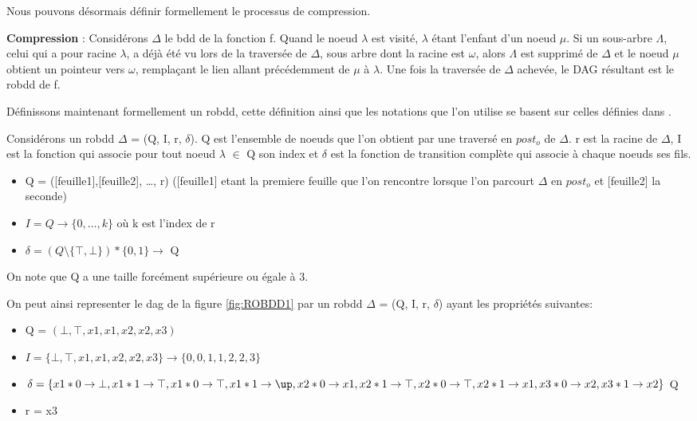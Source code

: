 \documentclass[french]{article}
\begin{document}
Nous pouvons désormais définir formellement le processus de compression.

\textbf{Compression} :  Considérons \(\Delta\) le bdd de la fonction f.  Quand le noeud \(\lambda\) est visité, \(\lambda\) étant l'enfant d'un noeud \(\mu\). Si un sous-arbre \(\Lambda\), celui qui a pour racine \(\lambda\), a déjà été vu lors de la traversée de \(\Delta\), sous arbre dont la racine est \(\omega\), alors \(\Lambda\) est supprimé de \(\Delta\) et le noeud \(\mu\) obtient un pointeur vers \(\omega\), remplaçant le lien allant précédemment de \(\mu\) à \(\lambda\). Une fois la traversée de \(\Delta\) achevée, le DAG résultant est le robdd de f.
\vspace{5mm} 

Définissons maintenant formellement un robdd, cette définition ainsi que les notations que l'on utilise se basent sur celles définies dans \cite{genitrini}.

Considérons un robdd \(\Delta\) = (Q, I, r, \(\delta\)). Q est l'ensemble de noeuds que l'on obtient par une traversé en \(post_{o}\) de \(\Delta\). r est la racine de \(\Delta\), I est la fonction qui associe pour tout noeud \(\lambda\) \(\in\) Q son index et \(\delta\) est la fonction de transition complète qui associe à chaque noeuds ses fils.
\begin{itemize}
    \item
    	Q  =   ([feuille1],[feuille2], …, r)
    	([feuille1] etant la premiere feuille que l'on rencontre lorsque l'on parcourt \(\Delta\) en \(post_{o}\) et [feuille2] la seconde)
    \item 
        \(I = Q   \rightarrow  \{0, \ldots , k\}\) où k est l'index de r
    \item 
       \( \delta = (Q \setminus  \{\top,  \bot\}) * \{0, 1\} \rightarrow \) Q
\end{itemize}

On note que Q a une taille forcément supérieure ou égale à 3.

On peut ainsi representer le dag de la figure \ref{fig:ROBDD1} par un robdd \(\Delta\) = (Q, I, r, \(\delta\)) ayant les propriétés suivantes:
\begin{itemize}
    \item
    	Q  =   \((\bot, \top, x1,x1,x2,x2,x3)\)
    \item 
        \(I = \{\bot, \top, x1,x1,x2,x2,x3\}   \rightarrow  \{0,0,1,1,2,2,3\}\)
    \item 
       \( \delta = \{ x1 * 0 \rightarrow \bot , x1 * 1 \rightarrow \top, x1 * 0 \rightarrow \top , x1 * 1 \rightarrow \up, x2 * 0 \rightarrow x1, x2 * 1 \rightarrow \top, x2 * 0 \rightarrow \top, x2 * 1 \rightarrow x1, x3 * 0 \rightarrow x2, x3 * 1 \rightarrow x2 \} \) Q
    \item 
        r = x3
\end{itemize}
\end{document}
